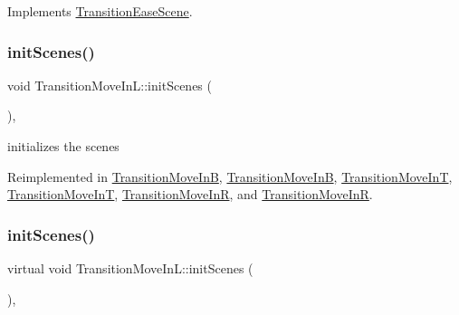 Implements \hyperlink{classTransitionEaseScene_a6f27540600b0d703ed30adc8976e65df}{Transition\+Ease\+Scene}.

\mbox{\label{classTransitionMoveInL_aeb7630758110537b1098673f21d7d197}} 
\subsubsection{\texorpdfstring{init\+Scenes()}{initScenes()}\hspace{0.1cm}{\footnotesize\ttfamily [1/2]}}
{\footnotesize\ttfamily void Transition\+Move\+In\+L\+::init\+Scenes (\begin{DoxyParamCaption}{ }\end{DoxyParamCaption})\hspace{0.3cm}{\ttfamily [protected]}, {\ttfamily [virtual]}}

initializes the scenes 

Reimplemented in \hyperlink{classTransitionMoveInB_ad262522b11cb2c360964857393316437}{Transition\+Move\+InB}, \hyperlink{classTransitionMoveInB_a3e86144d89423882fd847ee5e7e9b4ac}{Transition\+Move\+InB}, \hyperlink{classTransitionMoveInT_a25cb721d845913b43a385931ca1851f2}{Transition\+Move\+InT}, \hyperlink{classTransitionMoveInT_a029a7a031fc78f3a1b46f734c7d429b6}{Transition\+Move\+InT}, \hyperlink{classTransitionMoveInR_abea3ee2e03e712a74ffeb1be776b2ca8}{Transition\+Move\+InR}, and \hyperlink{classTransitionMoveInR_ab9629d0b43632bd10024dbe79b15d411}{Transition\+Move\+InR}.

\mbox{\label{classTransitionMoveInL_a12c02b6985e8aa0c4b6edcd5150d7674}} 
\subsubsection{\texorpdfstring{init\+Scenes()}{initScenes()}\hspace{0.1cm}{\footnotesize\ttfamily [2/2]}}
{\footnotesize\ttfamily virtual void Transition\+Move\+In\+L\+::init\+Scenes (\begin{DoxyParamCaption}{ }\end{DoxyParamCaption})\hspace{0.3cm}{\ttfamily [protected]}, {\ttfamily [virtual]}}

